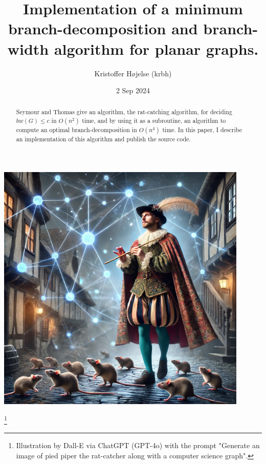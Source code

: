 \documentclass{article}
\title{Implementation of a minimum branch-decomposition and branch-width algorithm for planar graphs.}
\author{Kristoffer Højelse (krbh)}
\date{2 Sep 2024}
\begin{document}
\maketitle

\begin{center}
	\includegraphics[width=0.9\textwidth]{images/dalle-pied-piper-2.png}
\end{center}
\footnote{Illustration by Dall-E via ChatGPT (GPT-4o) with the prompt "Generate an image of pied piper the rat-catcher along with a computer science graph".}

\newpage



\begin{abstract}
	Seymour and Thomas give an algorithm, the rat-catching algorithm, for deciding $bw(G) \leq c$ in $O(n^2)$ time, and by using it as a subroutine, an algorithm to compute an optimal branch-decomposition in $O(n^4)$ time. In this paper, I describe an implementation of this algorithm and publish the source code.
\end{abstract}
\end{document}
